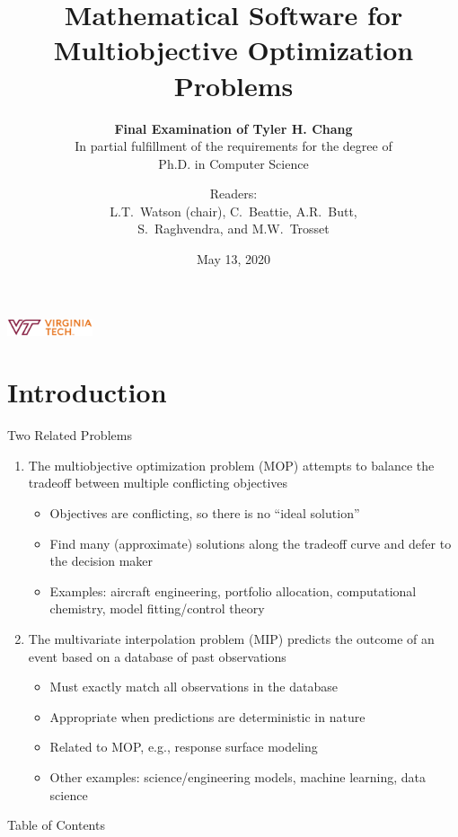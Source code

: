 \documentclass[xcolor=dvipsnames]{beamer}
\title{Mathematical Software for Multiobjective Optimization Problems}
\subtitle{{\bf Final Examination of Tyler H. Chang}\\
\medskip
In partial fulfillment of the requirements for the degree of\\
Ph.D. in Computer Science}
\author{Readers:\\
L.T.~Watson (chair), C.~Beattie, A.R.~Butt,\\
S.~Raghvendra, and M.W.~Trosset}
\date{May 13, 2020}
\institute{Virginia Polytechnic Institute and State University}
\begin{document}
\begin{frame}[plain] %
\vfill
\titlepage
\vfil %
\centerline{\includegraphics[height=0.5cm]{VPIlogo.png}}
\end{frame}

\section{Introduction}
\begin{frame}{Two Related Problems}
\begin{enumerate}
\item The multiobjective optimization problem (MOP) attempts to balance the
tradeoff between multiple conflicting objectives
\begin{itemize}
\item Objectives are conflicting, so there is no ``ideal solution''
\item Find many (approximate) solutions along the tradeoff curve and defer
to the decision maker
\item Examples: aircraft engineering, portfolio allocation, computational
chemistry, model fitting/control theory
\end{itemize}
\pause
\item The multivariate interpolation problem (MIP) predicts the outcome of an
event based on a database of past observations
\begin{itemize}
\item Must exactly match all observations in the database
\item Appropriate when predictions are deterministic in nature
\item Related to MOP, e.g., response surface modeling
\item Other examples: science/engineering models, machine learning, data science
\end{itemize}
\end{enumerate}
\end{frame}

\begin{frame}{Table of Contents}
\tableofcontents
\end{frame}
\end{document}

